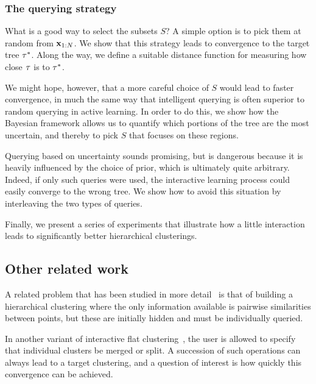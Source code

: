 \subsubsection*{The querying strategy}

What is a good way to select the subsets $S$? A simple option is to pick them at random from $\mathbf{x}_{1:N}$. We show that this strategy leads to convergence to the target tree $\tau^*$. Along the way, we define a suitable distance function for measuring how close $\tau$ is to $\tau^*$. 


We might hope, however, that a more careful choice of $S$ would lead to faster convergence, in much the same way that intelligent querying is often superior to random querying in active learning. In order to do this, we show how the Bayesian framework allows us to quantify which portions of the tree are the most uncertain, and thereby to pick $S$ that focuses on these regions.

Querying based on uncertainty sounds promising, but is dangerous because it is heavily influenced by the choice of prior, which is ultimately quite arbitrary. Indeed, if only such queries were used, the interactive learning process could easily converge to the wrong tree. We show how to avoid this situation by interleaving the two types of queries.

Finally, we present a series of experiments that illustrate how a little interaction leads to significantly better hierarchical clusterings.


\subsection{Other related work}

A related problem that has been studied in more detail~\citep{ZollerActiveClustering,ErikssonActiveSimilarities,KrishnamurthyEfficientClustering} is that of building a hierarchical clustering where the only information available is pairwise similarities between points, but these are initially hidden and must be individually queried.

In another variant of interactive flat clustering~\citep{Balcan2008ClusteringFeedback,AwasthiSupervisedClustering,AwasthiLocalClustering}, the user is allowed to specify that individual clusters be merged or split. A succession of such operations can always lead to a target clustering, and a question of interest is how quickly this convergence can be achieved.

